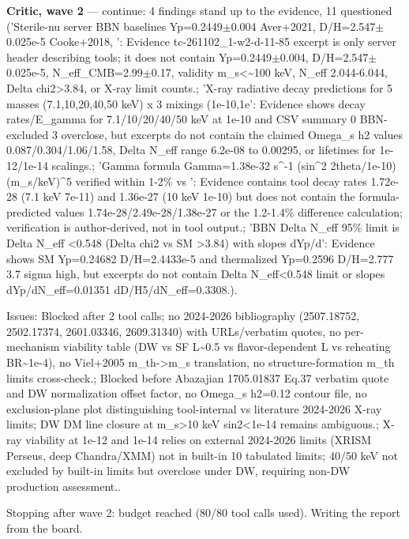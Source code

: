 \documentclass[11pt,a4paper]{article}
\begin{document}
\textbf{Critic, wave 2} --- continue: 4 findings stand up to the evidence, 11 questioned ('Sterile-nu server BBN baselines Yp=0.2449$\pm$0.004 Aver+2021, D/H=2.547$\pm$0.025e-5 Cooke+2018, ': Evidence tc-261102\_1-w2-d-11-85 excerpt is only server header describing tools; it does not contain Yp=0.2449$\pm$0.004, D/H=2.547$\pm$0.025e-5, N\_eff\_CMB=2.99$\pm$0.17, validity m\_s\textless{}\textasciitilde{}100 keV, N\_eff 2.044-6.044, Delta chi2\textgreater{}3.84, or X-ray limit counts.; 'X-ray radiative decay predictions for 5 masses (7.1,10,20,40,50 keV) x 3 mixings (1e-10,1e': Evidence shows decay rates/E\_gamma for 7.1/10/20/40/50 keV at 1e-10 and CSV summary 0 BBN-excluded 3 overclose, but excerpts do not contain the claimed Omega\_s h2 values 0.087/0.304/1.06/1.58, Delta N\_eff range 6.2e-08 to 0.00295, or lifetimes for 1e-12/1e-14 scalings.; 'Gamma formula Gamma=1.38e-32 s\textasciicircum{}-1 (sin\textasciicircum{}2 2theta/1e-10)(m\_s/keV)\textasciicircum{}5 verified within 1-2\% vs ': Evidence contains tool decay rates 1.72e-28 (7.1 keV 7e-11) and 1.36e-27 (10 keV 1e-10) but does not contain the formula-predicted values 1.74e-28/2.49e-28/1.38e-27 or the 1.2-1.4\% difference calculation; verification is author-derived, not in tool output.; 'BBN Delta N\_eff 95\% limit is Delta N\_eff \textless{}0.548 (Delta chi2 vs SM \textgreater{}3.84) with slopes dYp/d': Evidence shows SM Yp=0.24682 D/H=2.4433e-5 and thermalized Yp=0.2596 D/H=2.777 3.7 sigma high, but excerpts do not contain Delta N\_eff\textless{}0.548 limit or slopes dYp/dN\_eff=0.01351 dD/H5/dN\_eff=0.3308.).

Issues: Blocked after 2 tool calls; no 2024-2026 bibliography (2507.18752, 2502.17374, 2601.03346, 2609.31340) with URLs/verbatim quotes, no per-mechanism viability table (DW vs SF L\textasciitilde{}0.5 vs flavor-dependent L vs reheating BR\textasciitilde{}1e-4), no Viel+2005 m\_th-\textgreater{}m\_s translation, no structure-formation m\_th limits cross-check.; Blocked before Abazajian 1705.01837 Eq.37 verbatim quote and DW normalization offset factor, no Omega\_s h2=0.12 contour file, no exclusion-plane plot distinguishing tool-internal vs literature 2024-2026 X-ray limits; DW DM line closure at m\_s\textgreater{}10 keV sin2\textless{}1e-14 remains ambiguous.; X-ray viability at 1e-12 and 1e-14 relies on external 2024-2026 limits (XRISM Perseus, deep Chandra/XMM) not in built-in 10 tabulated limits; 40/50 keV not excluded by built-in limits but overclose under DW, requiring non-DW production assessment..

Stopping after wave 2: budget reached (80/80 tool calls used). Writing the report from the board.
\end{document}
